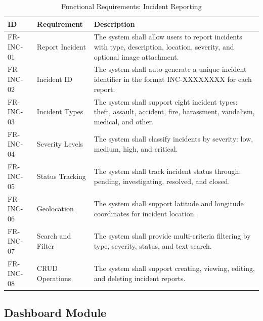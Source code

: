 \begin{table}[H]
  \centering
  \caption{Functional Requirements: Incident Reporting}
  \label{tab:fr-incident}
  \begin{tabularx}{\textwidth}{@{}l l X@{}}
    \toprule
    \textbf{ID} & \textbf{Requirement} & \textbf{Description} \\
    \midrule
    FR-INC-01 & Report Incident & The system shall allow users to report incidents with type, description, location, severity, and optional image attachment. \\
    FR-INC-02 & Incident ID & The system shall auto-generate a unique incident identifier in the format INC-XXXXXXXX for each report. \\
    FR-INC-03 & Incident Types & The system shall support eight incident types: theft, assault, accident, fire, harassment, vandalism, medical, and other. \\
    FR-INC-04 & Severity Levels & The system shall classify incidents by severity: low, medium, high, and critical. \\
    FR-INC-05 & Status Tracking & The system shall track incident status through: pending, investigating, resolved, and closed. \\
    FR-INC-06 & Geolocation & The system shall support latitude and longitude coordinates for incident location. \\
    FR-INC-07 & Search and Filter & The system shall provide multi-criteria filtering by type, severity, status, and text search. \\
    FR-INC-08 & CRUD Operations & The system shall support creating, viewing, editing, and deleting incident reports. \\
    \bottomrule
  \end{tabularx}
\end{table}

\subsection{Dashboard Module}

